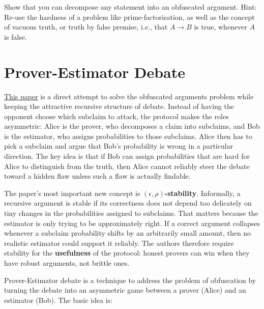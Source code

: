 \documentclass[11pt]{article}
\begin{document}
\begin{exercise}
\label{ex:ex17}
    Show that you can decompose any statement into an obfuscated argument. Hint: Re-use the hardness of a problem like prime-factorisation, as well as the concept of vacuous truth, or truth by false premise, i.e., that $A\rightarrow B$ is true, whenever $A$ is false.
\end{exercise}

\section{Prover-Estimator Debate}
\label{sec:pe}

\href{https://arxiv.org/pdf/2506.13609}{This paper} is a direct attempt to solve
the obfuscated arguments problem while keeping the attractive recursive structure
of debate. Instead of having the opponent choose which subclaim to attack, the
protocol makes the roles asymmetric: Alice is the prover, who decomposes a claim
into subclaims, and Bob is the estimator, who assigns probabilities to those
subclaims. Alice then has to pick a subclaim and argue that Bob's probability is
wrong in a particular direction. The key idea is that if Bob can assign
probabilities that are hard for Alice to distinguish from the truth, then Alice
cannot reliably steer the debate toward a hidden flaw unless such a flaw is
actually findable.

The paper's most important new concept is
\textbf{\((\epsilon,\rho)\)-stability}. Informally, a recursive argument is
stable if its correctness does not depend too delicately on tiny changes in the
probabilities assigned to subclaims. That matters because the estimator is only
trying to be approximately right. If a correct argument collapses whenever a
subclaim probability shifts by an arbitrarily small amount, then no realistic
estimator could support it reliably. The authors therefore require stability for
the \textbf{usefulness} of the protocol: honest provers can win when they have
robust arguments, not brittle ones.

Prover-Estimator debate is a technique to address the problem of obfuscation by turning the debate into an asymmetric game between a prover (Alice) and an estimator (Bob).
The basic idea is:
\end{document}
